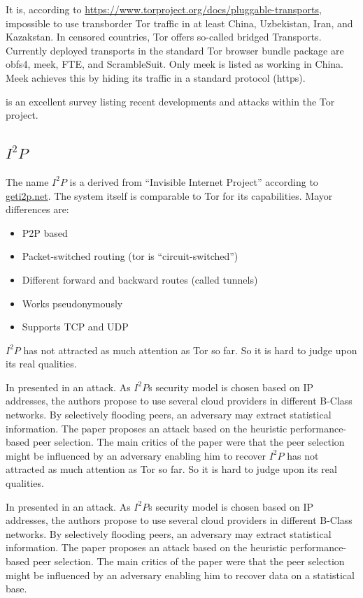 It is, according to \url{https://www.torproject.org/docs/pluggable-transports}, impossible to use transborder Tor traffic in at least China, Uzbekistan, Iran, and Kazakstan. In censored countries, Tor offers so-called bridged Transports. Currently deployed transports in the standard Tor browser bundle package are obfs4, meek, FTE, and ScrambleSuit. Only meek is listed as working in China. Meek achieves this by hiding its traffic in a standard protocol (https).

\cite{saleh2018shedding} is an excellent survey listing recent developments and attacks within the Tor project.

\subsection{\texorpdfstring{$I^2P$}{I2P}}
The name $I^2P$ is a derived from  ``Invisible Internet Project'' according to \href{https://geti2p.net/}{geti2p.net}. The system itself is comparable to Tor for its capabilities. Mayor differences are:
\begin{itemize}
	\item P2P based
	\item Packet-switched routing (tor is ``circuit-switched'')
	\item Different forward and backward routes (called tunnels)
	\item Works pseudonymously
	\item Supports TCP and UDP
\end{itemize}

$I^2P$ has not attracted as much attention as Tor so far. So it is hard to judge upon its real qualities.

In \citeyear{pets2011-i2p} \citeauthor{pets2011-i2p} presented in \cite{pets2011-i2p} an attack. As $I^2P$s security model is chosen based on IP addresses, the authors propose to use several cloud providers in different B-Class networks. By selectively flooding peers, an adversary may extract statistical information. The paper proposes an attack based on the heuristic performance-based peer selection. The main critics of the paper were that the peer selection might be influenced by an adversary enabling him to recover $I^2P$ has not attracted as much attention as Tor so far. So it is hard to judge upon its real qualities.

In \citeyear{pets2011-i2p} \citeauthor{pets2011-i2p} presented in \cite{pets2011-i2p} an attack. As $I^2P$s security model is chosen based on IP addresses, the authors propose to use several cloud providers in different B-Class networks. By selectively flooding peers, an adversary may extract statistical information. The paper proposes an attack based on the heuristic performance-based peer selection. The main critics of the paper were that the peer selection might be influenced by an adversary enabling him to recover data on a statistical base.


